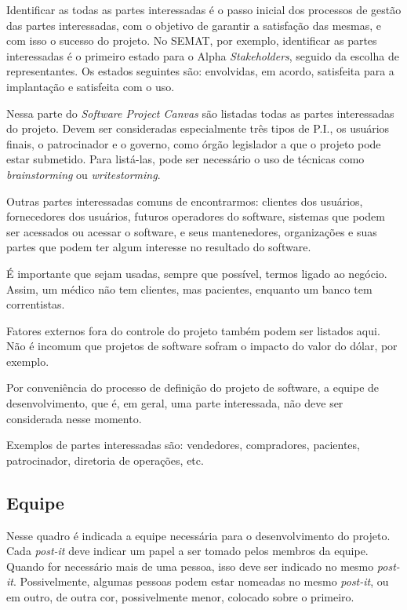 \documentclass{article}
\begin{document}
Identificar as todas as partes interessadas é o passo inicial dos processos de gestão das partes interessadas\citep{jacobson_essentials_2019,pmbok:6}, com o objetivo de garantir a satisfação das mesmas, e com isso o sucesso do projeto. No SEMAT, por exemplo, identificar as partes interessadas é o primeiro estado para o Alpha \textit{Stakeholders}, seguido da escolha de representantes\citep{jacobson_essentials_2019}.  Os estados seguintes são: envolvidas, em acordo, satisfeita para a implantação e satisfeita com o uso\citep{jacobson_essentials_2019}.

Nessa parte do \textit{Software Project Canvas} são listadas todas as partes interessadas  do projeto. Devem ser consideradas especialmente três tipos de P.I., os usuários finais, o patrocinador e o governo, como órgão legislador a que o projeto pode estar submetido. Para listá-las, pode ser necessário o uso de técnicas como \textit{brainstorming}\citep{tracy:2015} ou \textit{writestorming}\citep{gray:2010}.

Outras partes interessadas comuns de encontrarmos: clientes dos usuários, fornecedores dos usuários, futuros operadores do software, sistemas que podem ser acessados ou acessar o software, e seus mantenedores, organizações e suas partes que podem ter algum interesse no resultado do software.

É importante que sejam usadas, sempre que possível, termos ligado ao negócio. Assim, um médico não tem clientes, mas pacientes, enquanto um banco tem correntistas.

Fatores externos fora do controle do projeto também podem ser listados aqui. Não é incomum que projetos de software sofram o impacto do valor do dólar, por exemplo.

Por conveniência do processo de definição do projeto de software, a equipe de desenvolvimento, que é, em geral, uma parte interessada, não deve ser considerada nesse momento.

Exemplos de partes interessadas são: vendedores, compradores, pacientes, patrocinador, diretoria de operações, etc.

\subsection{Equipe}

Nesse quadro é indicada a equipe necessária para o desenvolvimento do projeto. Cada \textit{post-it} deve indicar um papel a ser tomado pelos membros da equipe. Quando for necessário mais de uma pessoa, isso deve ser indicado no mesmo \textit{post-it}. Possivelmente, algumas pessoas podem estar nomeadas no mesmo \textit{post-it}, ou em outro, de outra cor, possivelmente menor, colocado sobre o primeiro.
\end{document}
